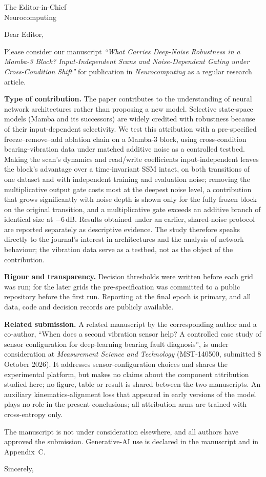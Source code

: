 \documentclass[11pt]{letter}
\newcommand{\PTITLE}{What Carries Deep-Noise Robustness in a Mamba-3 Block? Input-Independent Scans and Noise-Dependent Gating under Cross-Condition Shift}
\begin{document}
\begin{letter}{The Editor-in-Chief\\Neurocomputing}
\opening{Dear Editor,}

Please consider our manuscript \emph{``\PTITLE''} for publication in \emph{Neurocomputing} as a regular research article.

\textbf{Type of contribution.} The paper contributes to the understanding of neural network architectures rather than proposing a new model. Selective state-space models (Mamba and its successors) are widely credited with robustness because of their input-dependent selectivity. We test this attribution with a pre-specified freeze--remove--add ablation chain on a Mamba-3 block, using cross-condition bearing-vibration data under matched additive noise as a controlled testbed. Making the scan's dynamics and read/write coefficients input-independent leaves the block's advantage over a time-invariant SSM intact, on both transitions of one dataset and with independent training and evaluation noise; removing the multiplicative output gate costs most at the deepest noise level, a contribution that grows significantly with noise depth is shown only for the fully frozen block on the original transition, and a multiplicative gate exceeds an additive branch of identical size at $-6$\,dB. Results obtained under an earlier, shared-noise protocol are reported separately as descriptive evidence. The study therefore speaks directly to the journal's interest in architectures and the analysis of network behaviour; the vibration data serve as a testbed, not as the object of the contribution.

\textbf{Rigour and transparency.} Decision thresholds were written before each grid was run; for the later grids the pre-specification was committed to a public repository before the first run. Reporting at the final epoch is primary, and all data, code and decision records are publicly available.

\textbf{Related submission.} A related manuscript by the corresponding author and a co-author, ``When does a second vibration sensor help? A controlled case study of sensor configuration for deep-learning bearing fault diagnosis'', is under consideration at \emph{Measurement Science and Technology} (MST-140500, submitted 8 October 2026). It addresses sensor-configuration choices and shares the experimental platform, but makes no claims about the component attribution studied here; no figure, table or result is shared between the two manuscripts. An auxiliary kinematics-alignment loss that appeared in early versions of the model plays no role in the present conclusions; all attribution arms are trained with cross-entropy only.

The manuscript is not under consideration elsewhere, and all authors have approved the submission. Generative-AI use is declared in the manuscript and in Appendix~C.

\closing{Sincerely,}
\end{letter}
\end{document}

